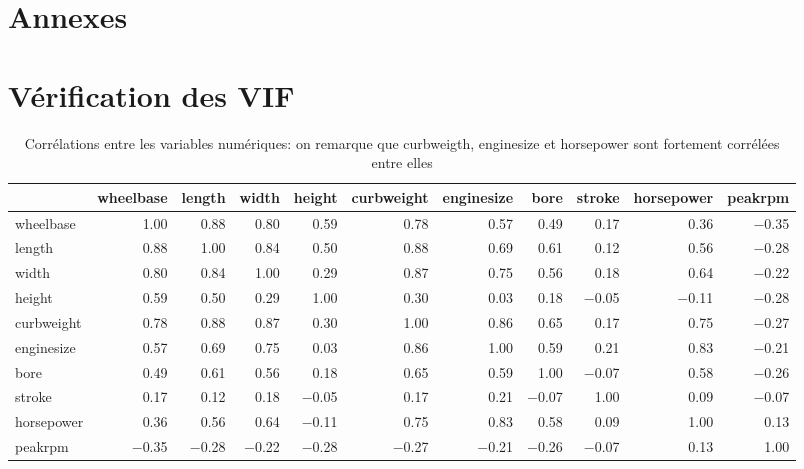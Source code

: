 \documentclass[11pt,a4paper]{article}
\begin{document}
\section{Annexes}
\appendix
\section{Vérification des VIF}
\begin{table}
	\scriptsize
	\centering
	\begin{tabulary}{1\textwidth}{|L|R|R|R|R|R|R|R|R|R|R|}
	\hline
 &    wheelbase &    length &    width &    height &    curbweight &    enginesize &    bore &    stroke &    horsepower &    peakrpm\\\hline

wheelbase &    1.00 &    0.88 &    0.80 &    0.59 &    0.78 &    0.57 &    0.49 &    0.17 &    0.36 &    $-$0.35\\\hline
length &    0.88 &    1.00 &    0.84 &    0.50 &    0.88 &    0.69 &    0.61 &    0.12 &    0.56 &    $-$0.28\\\hline
width &    0.80 &    0.84 &    1.00 &    0.29 &    0.87 &    0.75 &    0.56 &    0.18 &    0.64 &    $-$0.22\\\hline
height &    0.59 &    0.50 &    0.29 &    1.00 &    0.30 &    0.03 &    0.18 &    $-$0.05 &    $-$0.11 &    $-$0.28\\\hline
curbweight &    0.78 &    0.88 &    0.87 &    0.30 &    1.00 &    0.86 &    0.65 &    0.17 &    0.75 &    $-$0.27\\\hline
enginesize &    0.57 &    0.69 &    0.75 &    0.03 &    0.86 &    1.00 &    0.59 &    0.21 &    0.83 &    $-$0.21\\\hline
bore &    0.49 &    0.61 &    0.56 &    0.18 &    0.65 &    0.59 &    1.00 &    $-$0.07 &    0.58 &    $-$0.26\\\hline
stroke &    0.17 &    0.12 &    0.18 &    $-$0.05 &    0.17 &    0.21 &    $-$0.07 &    1.00 &    0.09 &    $-$0.07\\\hline
horsepower &    0.36 &    0.56 &    0.64 &    $-$0.11 &    0.75 &    0.83 &    0.58 &    0.09 &    1.00 &    0.13\\\hline
peakrpm &    $-$0.35 &    $-$0.28 &    $-$0.22 &    $-$0.28 &    $-$0.27 &    $-$0.21 &    $-$0.26 &    $-$0.07 &    0.13 &    1.00\\\hline

	
\end{tabulary}
			\caption{Corrélations entre les variables numériques: on remarque que curbweigth, enginesize et horsepower sont fortement corrélées entre elles}
			\label{table:corrvif}
		\end{table}
\end{document}
